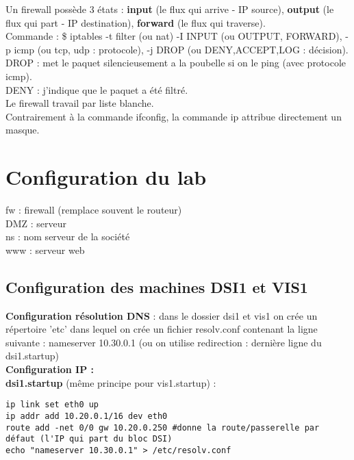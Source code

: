 \documentclass[a4paper]{article}
\begin{document}
Un firewall possède 3 états : \textbf{input} (le flux qui arrive - IP source), \textbf{output} (le flux qui part - IP destination), \textbf{forward} (le flux qui traverse). \\

Commande : \$ iptables -t filter (ou nat) -I INPUT (ou OUTPUT, FORWARD), -p icmp (ou tcp, udp : protocole), -j DROP (ou DENY,ACCEPT,LOG : décision). \\

DROP : met le paquet silencieusement a la poubelle si on le ping (avec protocole icmp). \\
DENY : j'indique que le paquet a été filtré. \\

Le firewall travail par liste blanche. \\

Contrairement à la commande ifconfig, la commande ip attribue directement un masque. 


	\section{Configuration du lab}

\noindent
fw : firewall (remplace souvent le routeur)\\
DMZ : serveur \\
ns : nom serveur de la société \\
www : serveur web \\

		\subsection{Configuration des machines DSI1 et VIS1}

\textbf{Configuration résolution DNS} : dans le dossier dsi1 et vis1 on crée un répertoire 'etc' dans lequel on crée un fichier resolv.conf contenant la ligne suivante : nameserver 10.30.0.1 (ou on utilise redirection : dernière ligne du dsi1.startup) \\

\textbf{Configuration IP : }\\

\noindent
\textbf{dsi1.startup }(même principe pour vis1.startup) : 

\begin{verbatim}
ip link set eth0 up
ip addr add 10.20.0.1/16 dev eth0
route add -net 0/0 gw 10.20.0.250 #donne la route/passerelle par défaut (l'IP qui part du bloc DSI)
echo "nameserver 10.30.0.1" > /etc/resolv.conf
\end{verbatim}
\end{document}
